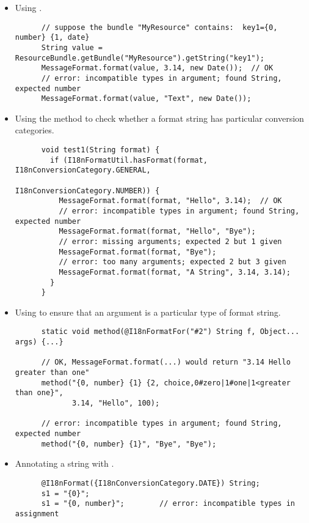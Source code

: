 \begin{itemize}
  \item Using .
\begin{Verbatim}
      // suppose the bundle "MyResource" contains:  key1={0, number} {1, date}
      String value = ResourceBundle.getBundle("MyResource").getString("key1");
      MessageFormat.format(value, 3.14, new Date());  // OK
      // error: incompatible types in argument; found String, expected number
      MessageFormat.format(value, "Text", new Date());
\end{Verbatim}
  \item Using the
    method to check whether a format
    string has particular conversion categories.
\begin{Verbatim}
      void test1(String format) {
        if (I18nFormatUtil.hasFormat(format, I18nConversionCategory.GENERAL,
                                             I18nConversionCategory.NUMBER)) {
          MessageFormat.format(format, "Hello", 3.14);  // OK
          // error: incompatible types in argument; found String, expected number
          MessageFormat.format(format, "Hello", "Bye");
          // error: missing arguments; expected 2 but 1 given
          MessageFormat.format(format, "Bye");
          // error: too many arguments; expected 2 but 3 given
          MessageFormat.format(format, "A String", 3.14, 3.14);
        }
      }
\end{Verbatim}
  \item Using 
    to ensure that an argument is a particular type of format string.
\begin{Verbatim}
      static void method(@I18nFormatFor("#2") String f, Object... args) {...}

      // OK, MessageFormat.format(...) would return "3.14 Hello greater than one"
      method("{0, number} {1} {2, choice,0#zero|1#one|1<greater than one}",
             3.14, "Hello", 100);

      // error: incompatible types in argument; found String, expected number
      method("{0, number} {1}", "Bye", "Bye");
\end{Verbatim}
  \item Annotating a string with
    .
\begin{Verbatim}
      @I18nFormat({I18nConversionCategory.DATE}) String;
      s1 = "{0}";
      s1 = "{0, number}";        // error: incompatible types in assignment
\end{Verbatim}
\end{itemize}

